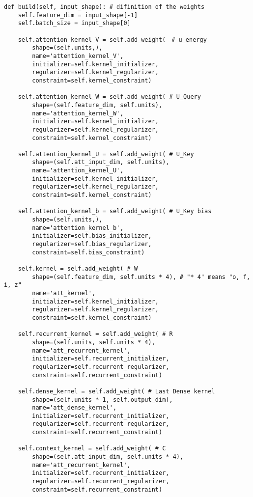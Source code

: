 \begin{lstlisting}[caption=デコーダー部の変更点, label=Decoder]
  def build(self, input_shape): # difinition of the weights
    self.feature_dim = input_shape[-1]
    self.batch_size = input_shape[0]

    self.attention_kernel_V = self.add_weight(　# u_energy
        shape=(self.units,),
        name='attention_kernel_V',
        initializer=self.kernel_initializer,
        regularizer=self.kernel_regularizer,
        constraint=self.kernel_constraint)

    self.attention_kernel_W = self.add_weight( # U_Query
        shape=(self.feature_dim, self.units),
        name='attention_kernel_W',
        initializer=self.kernel_initializer,
        regularizer=self.kernel_regularizer,
        constraint=self.kernel_constraint)

    self.attention_kernel_U = self.add_weight( # U_Key
        shape=(self.att_input_dim, self.units),
        name='attention_kernel_U',
        initializer=self.kernel_initializer,
        regularizer=self.kernel_regularizer,
        constraint=self.kernel_constraint)

    self.attention_kernel_b = self.add_weight( # U_Key bias
        shape=(self.units,),
        name='attention_kernel_b',
        initializer=self.bias_initializer,
        regularizer=self.bias_regularizer,
        constraint=self.bias_constraint)

    self.kernel = self.add_weight( # W
        shape=(self.feature_dim, self.units * 4), # "* 4" means "o, f, i, z"
        name='att_kernel',
        initializer=self.kernel_initializer,
        regularizer=self.kernel_regularizer,
        constraint=self.kernel_constraint)

    self.recurrent_kernel = self.add_weight( # R
        shape=(self.units, self.units * 4),
        name='att_recurrent_kernel',
        initializer=self.recurrent_initializer,
        regularizer=self.recurrent_regularizer,
        constraint=self.recurrent_constraint)

    self.dense_kernel = self.add_weight( # Last Dense kernel
        shape=(self.units * 1, self.output_dim),
        name='att_dense_kernel',
        initializer=self.recurrent_initializer,
        regularizer=self.recurrent_regularizer,
        constraint=self.recurrent_constraint)

    self.context_kernel = self.add_weight( # C
        shape=(self.att_input_dim, self.units * 4),
        name='att_recurrent_kernel',
        initializer=self.recurrent_initializer,
        regularizer=self.recurrent_regularizer,
        constraint=self.recurrent_constraint)


\end{lstlisting}
